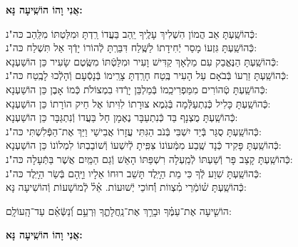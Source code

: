 \documentclass[twoside, openany, parskip=half, 11pt]{book}
\begin{document}
\begin{sometimes}
\begin{large}
\textbf{אֲנִי וָהוֹ הוֹשִֽׁיעָה נָּא:}
\end{large}

\begin{small}
כְּֿהוֹשַֽׁעְתָּ אַב הֲמוֹן הִשְׁלִיךְ עָלֶֽיךָ יַֽהַב בַּעֲדוֹ רַֽדְתָּ וּמִלַּטְתּוֹ מִלַּֽהַב \hfill כּה"נ:\\
כְּֿהוֹשַֽׁעְתָּ גִּזְעוֹ מָסַר יְֿחִידָתוֹ לַשֶּֽׁלַח דִּבַּרְֽתָּ לְֿהוֹרוֹ יָדְֿךָ אַל תִּשְׁלַח \hfill כּה"נ: \\
כְּֿהוֹשַֽׁעְתָּ הַנֶּאֱבַק עִם מַלְאָךְ קַדִּישׁ וָעִיר וּמִלַּטְֿתּוֹ מִשֶּֽׂטֶם שָׂעִיר \hfill כֵּן הוֹשַׁעְנָא: \\
כְּֿהוֹשַֽׁעְתָּ זַרְעוֹ בְּֿבֹאָם עַל הָעִיר בֶּֽטַח חָרַֽדְתָּ צָרֵֽימוֹ בְּֿנָסְֿעָם וְֿהָלְֿכוּ לָבֶֽטַח \hfill כּה"נ: \\
כְּֿהוֹשַֽׁעְתָּ טְֿהוֹרִים מִמַּפְרִיכֵֽמוֹ בְּֿמַלְבֵּן יָרְֿדוּ בִמְצוֹלֹת כְּֿמוֹ אָבֶן \hfill כֵּן הוֹשַׁעְנָא: \\
כְּֿהוֹשַֽׁעְתָּ כָּלִיל כְּֿנִתְעַלְּֿמָה בְּֿגֹֽמֶא צוּרָתוֹ לִוִּיתוֹ אֶל חֵיק הוֹרָתוֹ \hfill כֵּן הוֹשַׁעְנָא: \\
כְּֿהוֹשַֽׁעְתָּ מֻצְנָף בַּד כְּֿנִתְעַבָּר נֶאֶמָן חָל בַּעֲדוֹ וְֿנִתְגַּבָּר \hfill כֵּן הוֹשַׁעְנָא: \\
כְּֿהוֹשַֽׁעְתָּ סֻגַּר בְּֿיַד יִשְׁבִּי בְּֿנֹב הַגִּתִּי עֲזָרוֹ אֲבִישַׁי וַיַּךְ אֶת־הַפְּֿלִשְׁתִּי \hfill כּה"נ:\\
כְּֿהוֹשַֽׁעְתָּ פָּקִיד כְּֿנָד שֶֽׁבַע מִמְּֿעוֹנוֹ צִּפִּֽיתָ לְֿיִשְׁעוֹ וְֿשׁוֹבַבְתּוֹ לִמְלוֹנוֹ \hfill כֵּן הוֹשַׁעְנָא:\\
כְּֿהוֹשַֽׁעְתָּ קָצַב פָּר וְֿשַׁעְתּוֹ לְֿמַֽעְלָה רִשְׁפַּתּוֹ הָאֵשׁ וְֿגַם הַמַּֽיִם אֲשֶׁר בַּתְּֿעָלָה \hfill כּה"נ:\\
כְּֿהוֹשַֽׁעְתָּ שִׁוַע לְֿךָ כִּי מֵת הַיָּֽלֶד תָּשֵׁב רוּחוֹ אֵלָיו וַיָּֽהָם בְּֿשַׂר הַיָּֽלֶד \hfill כּה"נ:\\
 כְּֿהוֹשַֽׁעְתָּ שׁ֗וֹמְֿרֵי מִ֗צְווֹת וְֿ֗חוֹכֵי יְֿשׁוּעוֹת. אֵ֗ל֗ לְֿמוֹשָׁעוֹת \hfill וְֿהוֹשִׁיעָה נָּא:\\

\end{small}

הוֹשִׁ֤יעָה אֶת־עַמֶּ֗ךָ וּבָרֵ֥ךְ אֶת־נַֽחֲלָתֶ֑ךָ וּֽרְעֵ֥ם וְֿ֝נַשְּֿׂאֵ֗ם עַד־הָֽעוֹלָֽם:


\begin{large}
\textbf{אֲנִי וָהוֹ הוֹשִֽׁיעָה נָּא:}
\end{large}


\end{sometimes}
\end{document}
